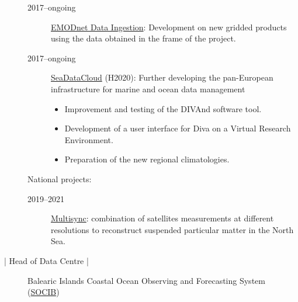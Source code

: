 \documentclass[10pt,a4paper,svgnames]{article}
\begin{document}
\begin{description}
\begin{description}
\item[2017--ongoing] \href{https://www.emodnet-ingestion.eu}{EMODnet Data Ingestion}: Development on new gridded products using the data obtained in the frame of the project.

\item[2017--ongoing] \href{https://www.seadatanet.org}{SeaDataCloud} (H2020): Further developing the pan-European infrastructure for marine and ocean data management
\begin{itemize}
\item Improvement and testing of the DIVAnd software tool.
\item Development of a user interface for Diva on a Virtual Research Environment.
\item Preparation of the new regional climatologies.
\end{itemize}

\end{description}
National projects:
\begin{description}
\item[2019--2021] \href{https://odnature.naturalsciences.be/multi-sync/en/}{Multisync}: combination of satellites measurements at different resolutions to reconstruct suspended particular matter in the North Sea.
\end{description}

\item[\datebox{2014/03--2017/01} | Head of Data Centre |] Balearic Islands Coastal Ocean Observing and Forecasting System (\href{http//www.socib.eu}{SOCIB})


\end{description}
\end{document}
